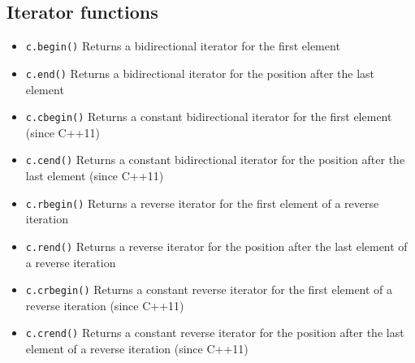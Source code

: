 \documentclass{report}
\begin{document}
\bigbreak \noindent 
\subsection{Iterator functions}
\begin{itemize}
    \item \texttt{c.begin()} Returns a bidirectional iterator for the first element
    \item \texttt{c.end()} Returns a bidirectional iterator for the position after the last element
    \item \texttt{c.cbegin()} Returns a constant bidirectional iterator for the first element (since C++11)
    \item \texttt{c.cend()} Returns a constant bidirectional iterator for the position after the last element (since C++11)
    \item \texttt{c.rbegin()} Returns a reverse iterator for the first element of a reverse iteration
    \item \texttt{c.rend()} Returns a reverse iterator for the position after the last element of a reverse iteration
    \item \texttt{c.crbegin()} Returns a constant reverse iterator for the first element of a reverse iteration (since C++11)
    \item \texttt{c.crend()} Returns a constant reverse iterator for the position after the last element of a reverse iteration (since C++11)
\end{itemize}

\bigbreak \noindent 
\end{document}
